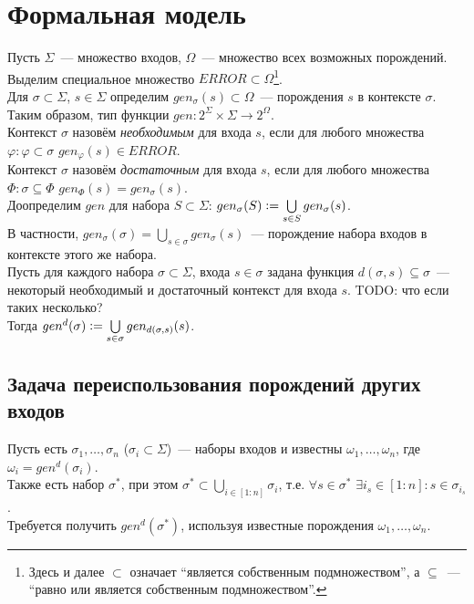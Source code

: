\newpage
\tableofcontents

\section{Формальная модель}

Пусть $\Sigma$~--- множество входов, $\Omega$~--- множество всех возможных порождений. Выделим специальное множество $ERROR \subset \Omega$\footnote{Здесь и далее $\subset$ означает ``является собственным подмножеством'', а $\subseteq$~--- ``равно или является собственным подмножеством''.}.\\
Для $\sigma \subset \Sigma$, $s \in \Sigma$ определим $gen_\sigma(s) \subset \Omega$~--- порождения $s$ в контексте $\sigma$. Таким образом, тип функции $gen: 2^\Sigma \times \Sigma \to 2^\Omega$.\\
Контекст $\sigma$ назовём \textit{необходимым} для входа $s$, если для любого множества $\varphi: \varphi \subset \sigma$ $gen_\varphi(s) \in ERROR$.\\
Контекст $\sigma$ назовём \textit{достаточным} для входа $s$, если для любого множества $\Phi: \sigma \subseteq \Phi$ $gen_\Phi(s) = gen_\sigma(s)$.\\
Доопределим $gen$ для набора $S \subset \Sigma$: $gen_\sigma(S) \vcentcolon= \bigcup\limits_{s \in S} gen_\sigma(s)$.\\
В частности, $gen_\sigma(\sigma) = \bigcup\limits_{s \in \sigma} gen_\sigma(s)$~--- порождение набора входов в контексте этого же набора.\\
Пусть для каждого набора $\sigma \subset \Sigma$, входа $s \in \sigma$ задана функция $d(\sigma, s) \subseteq \sigma$~--- некоторый необходимый и достаточный контекст для входа $s$. TODO: что если таких несколько?\\
Тогда $gen^d(\sigma) \vcentcolon= \bigcup\limits_{s \in \sigma} gen_{d(\sigma, s)}(s)$.



\subsection{Задача переиспользования порождений других входов}

Пусть есть $\sigma_1, \dots, \sigma_n$ ($\sigma_i \subset \Sigma$)~--- наборы входов и известны $\omega_1, \dots, \omega_n$, где $\omega_i = gen^d(\sigma_i)$.\\
Также есть набор $\sigma^*$, при этом $\sigma^* \subset \bigcup\limits_{i \in [1:n]}\sigma_i$, т.е. $\forall s \in \sigma^*$ $\exists i_s \in [1:n]: s \in \sigma_{i_s}$.\\
Требуется получить $gen^d(\sigma^*)$, используя известные порождения $\omega_1, \dots, \omega_n$.

